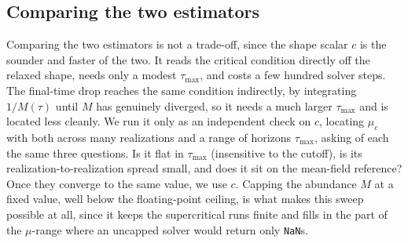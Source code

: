 \subsection{Comparing the two estimators}
\label{sec:estimator-comparison}

Comparing the two estimators is not a trade-off, since the shape scalar $c$ is the sounder
and faster of the two. It reads the critical condition directly off the relaxed
shape, needs only a modest $\tau_{\max}$, and costs a few hundred solver steps. The
final-time drop reaches the same condition indirectly, by integrating $1/M(\tau)$
until $M$ has genuinely diverged, so it needs a much larger $\tau_{\max}$ and is
located less cleanly. We run it only as an independent check on $c$, locating
$\mu_c$ with both across many realizations and a range of horizons $\tau_{\max}$,
asking of each the same three questions. Is it flat in $\tau_{\max}$ (insensitive to
the cutoff), is its realization-to-realization spread small, and does it sit on the
mean-field reference? Once they converge to the same value, we use $c$. Capping the abundance $M$ at a fixed value, well below the floating-point ceiling,
is what makes this sweep possible at all, since it keeps the supercritical runs finite and
fills in the part of the $\mu$-range where an uncapped solver would return only
\texttt{NaN}s.

